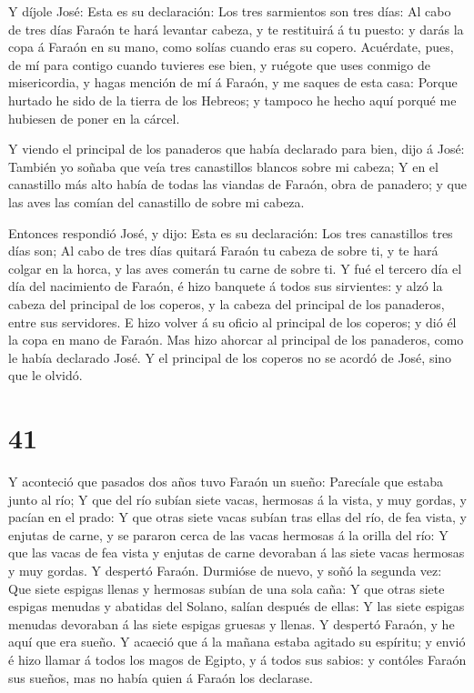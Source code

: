  Y díjole José: Esta es su declaración: Los tres sarmientos
son tres días:  Al cabo de tres días Faraón te hará
levantar cabeza, y te restituirá á tu puesto: y darás la copa á Faraón
en su mano, como solías cuando eras su copero.  Acuérdate,
pues, de mí para contigo cuando tuvieres ese bien, y ruégote que uses
conmigo de misericordia, y hagas mención de mí á Faraón, y me saques de
esta casa:  Porque hurtado he sido de la tierra de los
Hebreos; y tampoco he hecho aquí porqué me hubiesen de poner en la
cárcel.

 Y viendo el principal de los panaderos que había declarado
para bien, dijo á José: También yo soñaba que veía tres canastillos
blancos sobre mi cabeza;  Y en el canastillo más alto había
de todas las viandas de Faraón, obra de panadero; y que las aves las
comían del canastillo de sobre mi cabeza.

 Entonces respondió José, y dijo: Esta es su declaración:
Los tres canastillos tres días son;  Al cabo de tres días
quitará Faraón tu cabeza de sobre ti, y te hará colgar en la horca, y
las aves comerán tu carne de sobre ti.  Y fué el tercero
día el día del nacimiento de Faraón, é hizo banquete á todos sus
sirvientes: y alzó la cabeza del principal de los coperos, y la cabeza
del principal de los panaderos, entre sus servidores.  E
hizo volver á su oficio al principal de los coperos; y dió él la copa en
mano de Faraón.  Mas hizo ahorcar al principal de los
panaderos, como le había declarado José.  Y el principal de
los coperos no se acordó de José, sino que le olvidó.

\hypertarget{section-40}{%
\section{41}\label{section-40}}

 Y aconteció que pasados dos años tuvo Faraón un sueño:
Parecíale que estaba junto al río;  Y que del río subían
siete vacas, hermosas á la vista, y muy gordas, y pacían en el prado:
 Y que otras siete vacas subían tras ellas del río, de fea
vista, y enjutas de carne, y se pararon cerca de las vacas hermosas á la
orilla del río:  Y que las vacas de fea vista y enjutas de
carne devoraban á las siete vacas hermosas y muy gordas. Y despertó
Faraón.  Durmióse de nuevo, y soñó la segunda vez: Que siete
espigas llenas y hermosas subían de una sola caña:  Y que
otras siete espigas menudas y abatidas del Solano, salían después de
ellas:  Y las siete espigas menudas devoraban á las siete
espigas gruesas y llenas. Y despertó Faraón, y he aquí que era sueño.
 Y acaeció que á la mañana estaba agitado su espíritu; y
envió é hizo llamar á todos los magos de Egipto, y á todos sus sabios: y
contóles Faraón sus sueños, mas no había quien á Faraón los declarase.

